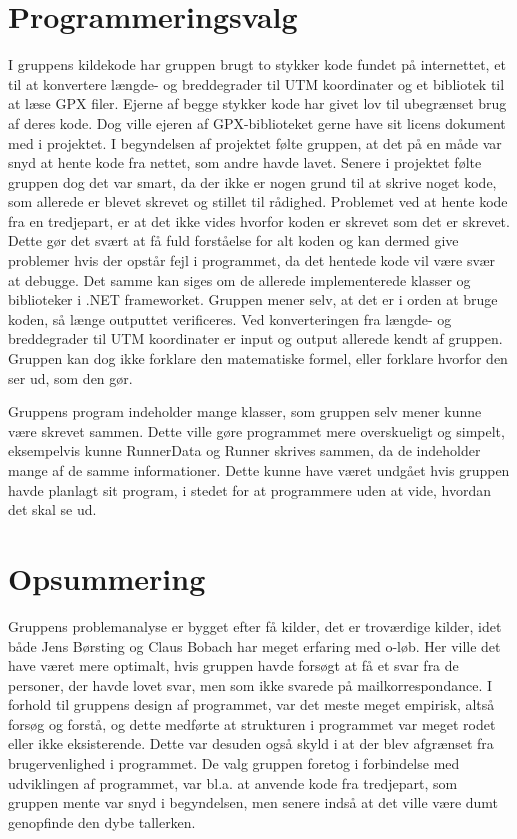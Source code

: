\section{Programmeringsvalg}
I gruppens kildekode har gruppen brugt to stykker kode fundet på internettet, et til at konvertere længde- og breddegrader til UTM koordinater og et bibliotek til at læse GPX filer. Ejerne af begge stykker kode har givet lov til ubegrænset brug af deres kode. Dog ville ejeren af GPX-biblioteket gerne have sit licens dokument med i projektet. I begyndelsen af projektet følte gruppen, at det på en måde var snyd at hente kode fra nettet, som andre havde lavet. Senere i projektet følte gruppen dog det var smart, da der ikke er nogen grund til at skrive noget kode, som allerede er blevet skrevet og stillet til rådighed. \newline
Problemet ved at hente kode fra en tredjepart, er at det ikke vides hvorfor koden er skrevet som det er skrevet. Dette gør det svært at få fuld forståelse for alt koden og kan dermed give problemer hvis der opstår fejl i programmet, da det hentede kode vil være svær at debugge. Det samme kan siges om de allerede implementerede klasser og biblioteker i .NET frameworket. Gruppen mener selv, at det er i orden at bruge koden, så længe outputtet verificeres.\newline
Ved konverteringen fra længde- og breddegrader til UTM koordinater er input og output allerede kendt af gruppen. Gruppen kan dog ikke forklare den matematiske formel, eller forklare hvorfor den ser ud, som den gør. 

Gruppens program indeholder mange klasser, som gruppen selv mener kunne være skrevet sammen. Dette ville gøre programmet mere overskueligt og simpelt, eksempelvis kunne RunnerData og Runner skrives sammen, da de indeholder mange af de samme informationer. Dette kunne have været undgået hvis gruppen havde planlagt sit program, i stedet for at programmere uden at vide, hvordan det skal se ud. 

\section{Opsummering}
Gruppens problemanalyse er bygget efter få kilder, det er troværdige kilder, idet både Jens Børsting og Claus Bobach har meget erfaring med o-løb. Her ville det have været mere optimalt, hvis gruppen havde forsøgt at få et svar fra de personer, der havde lovet svar, men som ikke svarede på mailkorrespondance. \newline
I forhold til gruppens design af programmet, var det meste meget empirisk, altså forsøg og forstå, og dette medførte at strukturen i programmet var meget rodet eller ikke eksisterende. Dette var desuden også skyld i at der blev afgrænset fra brugervenlighed i programmet. \newline
De valg gruppen foretog i forbindelse med udviklingen af programmet, var bl.a. at anvende kode fra tredjepart, som gruppen mente var snyd i begyndelsen, men senere indså at det ville være dumt genopfinde den dybe tallerken. 


